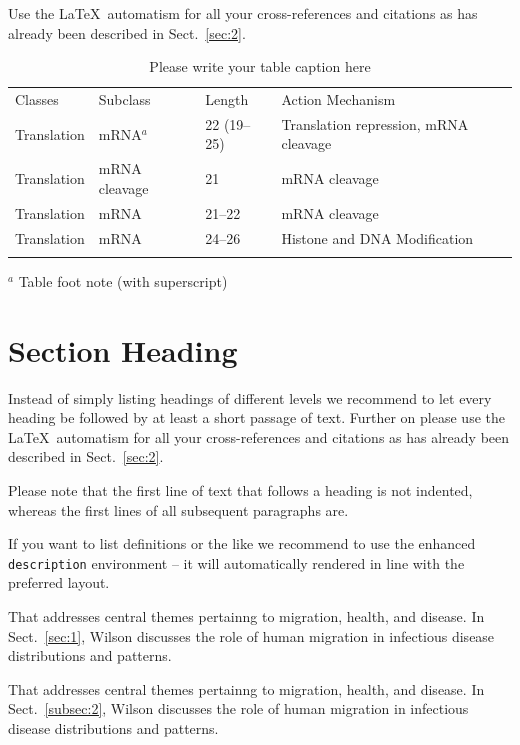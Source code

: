 \documentclass[graybox]{svmult}
\begin{document}
{ Use the \LaTeX\ automatism for all your cross-refer\-ences and citations as has already been described in Sect.~\ref{sec:2}.
%
%
\begin{table}[!t]
\caption{Please write your table caption here}
\label{tab:1}       %
%
%
\begin{tabular}{p{2cm}p{2.4cm}p{2cm}p{4.9cm}}
\hline\noalign{\smallskip}
Classes & Subclass & Length & Action Mechanism  \\
\noalign{\smallskip}\svhline\noalign{\smallskip}
Translation & mRNA$^a$  & 22 (19--25) & Translation repression, mRNA cleavage\\
Translation & mRNA cleavage & 21 & mRNA cleavage\\
Translation & mRNA  & 21--22 & mRNA cleavage\\
Translation & mRNA  & 24--26 & Histone and DNA Modification\\
\noalign{\smallskip}\hline\noalign{\smallskip}
\end{tabular}
$^a$ Table foot note (with superscript)
\end{table}
%
\section{Section Heading}
\label{sec:3}
Instead of simply listing headings of different levels we recommend to let every heading be followed by at least a short passage of text.  Further on please use the \LaTeX\ automatism for all your cross-references and citations as has already been described in Sect.~\ref{sec:2}.

Please note that the first line of text that follows a heading is not indented, whereas the first lines of all subsequent paragraphs are.

If you want to list definitions or the like we recommend to use the enhanced \verb|description| environment -- it will automatically rendered in line with the preferred layout.

\begin{description}[Type 1]
\item[Type 1]{That addresses central themes pertainng to migration, health, and disease. In Sect.~\ref{sec:1}, Wilson discusses the role of human migration in infectious disease distributions and patterns.}
\item[Type 2]{That addresses central themes pertainng to migration, health, and disease. In Sect.~\ref{subsec:2}, Wilson discusses the role of human migration in infectious disease distributions and patterns.}
\end{description}

}
\end{document}
